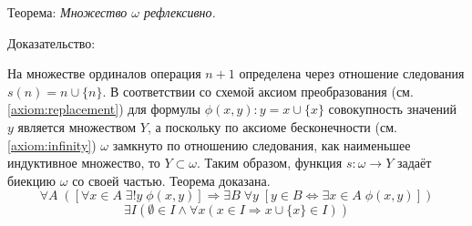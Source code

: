 \documentclass[12pt]{article}
\begin{document}
Теорема: {\sl Множество $\omega$ рефлексивно.}

Доказательство: 

На множестве ординалов операция $n + 1$ определена через отношение следования $s(n) = n \cup \{ n \}$. В соответствии со схемой аксиом преобразования (см. \ref{axiom:replacement}) для формулы $\phi(x, y): y = x \cup \{ x \}$ совокупность значений $y$ является множеством $Y$, а поскольку по аксиоме бесконечности (см. \ref{axiom:infinity}) $\omega$ замкнуто по отношению следования, как наименьшее индуктивное множество, то $Y \subset \omega$. Таким образом, функция $s : \omega \to Y$ задаёт биекцию $\omega$ со своей частью. Теорема доказана.
\begin{equation}
\forall A \; ( [ \forall x \in A \; \exists! y \; \phi(x, y) ] \Rightarrow \exists B \; \forall y \; [ y \in B \Leftrightarrow \exists x \in A \; \phi(x, y) ])
\label{axiom:replacement}
\end{equation}
\begin{equation}
\exists I (\emptyset \in I \wedge \forall x (x \in I \Rightarrow x \cup \{ x \} \in I))
\label{axiom:infinity}
\end{equation}
\end{document}
